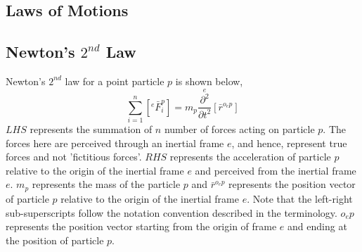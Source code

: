 \documentclass[class=report, 12pt, crop=false]{standalone}
\begin{document}
\begin{center}

\chapter{Laws of Motions}
\begin{comment}
\end{comment}
\section{Newton's $2^{nd}$ Law}
\begin{comment}
\end{comment}
Newton's $2^{nd}$ law for a point particle $p$ is shown below,
$$\sum^{n}_{i = 1}\left[{}^{e}\bar{F}^{p}_{i}\right] = m_{p}\overset{e}{\frac{\partial^{2}}{\partial t^{2}}}[\bar{r}^{o_{e}p}]$$
$LHS$ represents the summation of $n$ number of forces acting on particle $p$. The forces here are perceived through an inertial frame $e$, and hence, represent true forces and not 'fictitious forces'. $RHS$ represents the acceleration of particle $p$ relative to the origin of the inertial frame $e$ and perceived from the inertial frame $e$. $m_{p}$ represents the mass of the particle $p$ and $\bar{r}^{o_{e}p}$ represents the position vector of particle $p$ relative to the origin of the inertial frame $e$. Note that the left-right sub-superscripts follow the notation convention described in the terminology. $o_{e}p$ represents the position vector starting from the origin of frame $e$ and ending at the position of particle $p$. 

\end{center}
\end{document}
